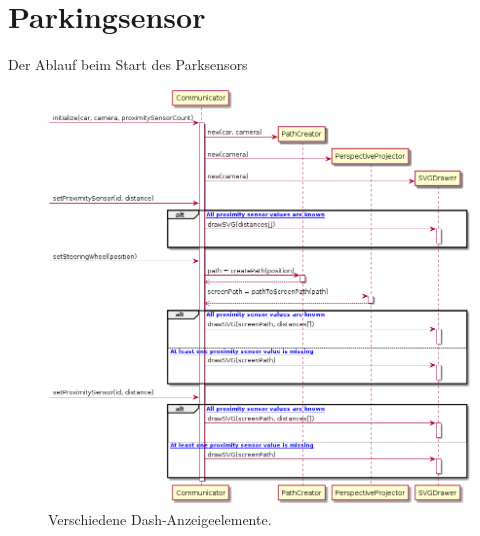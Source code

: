 \documentclass[entwurf.tex]{subfiles}
\begin{document}
	\section{Parkingsensor}
		Der Ablauf beim Start des Parksensors
		\begin{figure}[H]
  			\begin{center}
 				\includegraphics[width=\textwidth]{diagrams/ParkingSensor/sequence_diagram.png}
  				\caption{Verschiedene Dash-Anzeigeelemente.}
  			\end{center}
  		\end{figure}
\end{document}
